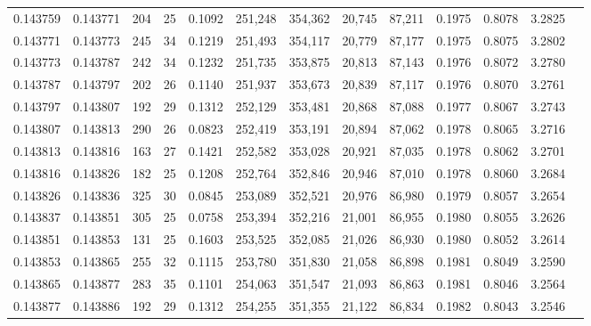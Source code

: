 \begin{tabular}{rrrrrrrrrrrrr}
0.143759 & 0.143771 & 204 &  25 &                                     0.1092 & 251,248 & 354,362 &  20,745 &  87,211 & 0.1975 & 0.8078 & 3.2825 \\
0.143771 & 0.143773 & 245 &  34 &                                     0.1219 & 251,493 & 354,117 &  20,779 &  87,177 & 0.1975 & 0.8075 & 3.2802 \\
0.143773 & 0.143787 & 242 &  34 &                                     0.1232 & 251,735 & 353,875 &  20,813 &  87,143 & 0.1976 & 0.8072 & 3.2780 \\
0.143787 & 0.143797 & 202 &  26 &                                     0.1140 & 251,937 & 353,673 &  20,839 &  87,117 & 0.1976 & 0.8070 & 3.2761 \\
0.143797 & 0.143807 & 192 &  29 &                                     0.1312 & 252,129 & 353,481 &  20,868 &  87,088 & 0.1977 & 0.8067 & 3.2743 \\
0.143807 & 0.143813 & 290 &  26 &                                     0.0823 & 252,419 & 353,191 &  20,894 &  87,062 & 0.1978 & 0.8065 & 3.2716 \\
0.143813 & 0.143816 & 163 &  27 &                                     0.1421 & 252,582 & 353,028 &  20,921 &  87,035 & 0.1978 & 0.8062 & 3.2701 \\
0.143816 & 0.143826 & 182 &  25 &                                     0.1208 & 252,764 & 352,846 &  20,946 &  87,010 & 0.1978 & 0.8060 & 3.2684 \\
0.143826 & 0.143836 & 325 &  30 &                                     0.0845 & 253,089 & 352,521 &  20,976 &  86,980 & 0.1979 & 0.8057 & 3.2654 \\
0.143837 & 0.143851 & 305 &  25 &                                     0.0758 & 253,394 & 352,216 &  21,001 &  86,955 & 0.1980 & 0.8055 & 3.2626 \\
0.143851 & 0.143853 & 131 &  25 &                                     0.1603 & 253,525 & 352,085 &  21,026 &  86,930 & 0.1980 & 0.8052 & 3.2614 \\
0.143853 & 0.143865 & 255 &  32 &                                     0.1115 & 253,780 & 351,830 &  21,058 &  86,898 & 0.1981 & 0.8049 & 3.2590 \\
0.143865 & 0.143877 & 283 &  35 &                                     0.1101 & 254,063 & 351,547 &  21,093 &  86,863 & 0.1981 & 0.8046 & 3.2564 \\
0.143877 & 0.143886 & 192 &  29 &                                     0.1312 & 254,255 & 351,355 &  21,122 &  86,834 & 0.1982 & 0.8043 & 3.2546 \\

\end{tabular}
